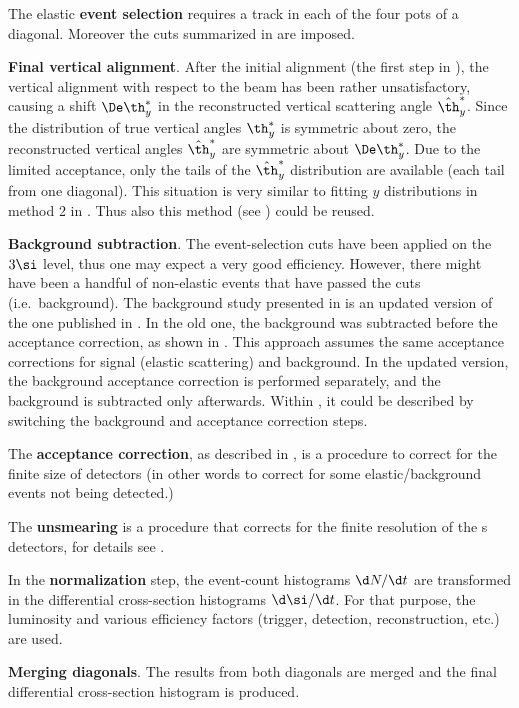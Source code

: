 \> The elastic {\bf event selection} requires a track in each of the four pots of a diagonal. Moreover the cuts summarized in  are imposed.

\> {\bf Final vertical alignment}. After the initial alignment (the first step in ), the vertical alignment with respect to the beam has been rather unsatisfactory, causing a shift $\De\th_y^*$ in the reconstructed vertical scattering angle $\hat \th_y^*$. Since the distribution of true vertical angles $\th_y^*$ is symmetric about zero, the reconstructed vertical angles $\hat\th_y^*$ are symmetric about $\De\th_y^*$. Due to the limited acceptance, only the tails of the $\hat\th_y^*$ distribution are available (each tail from one diagonal). This situation is very similar to fitting $y$ distributions in method 2 in . Thus also this method (see ) could be reused.

\> {\bf Background subtraction}. The event-selection cuts have been applied on the $3\si$ level, thus one may expect a very good efficiency. However, there might have been a handful of non-elastic events that have passed the cuts (i.e.~background). The background study presented in  is an updated version of the one published in . In the old one, the background was subtracted before the acceptance correction, as shown in . This approach assumes the same acceptance corrections for signal (elastic scattering) and background. In the updated version, the background acceptance correction is performed separately, and the background is subtracted only afterwards. Within , it could be described by switching the background and acceptance correction steps.

\> The {\bf acceptance correction}, as described in , is a procedure to correct for the finite size of  detectors (in other words to correct for some elastic/background events not being detected.)

\> The {\bf unsmearing} is a procedure that corrects for the finite resolution of the s detectors, for details see .

\> In the {\bf normalization} step, the event-count histograms $\d N/\d t$ are transformed in the differential cross-section histograms $\d\si/\d t$. For that purpose, the luminosity and various efficiency factors (trigger, detection, reconstruction, etc.) are used.

\> {\bf Merging diagonals}. The results from both diagonals are merged and the final differential cross-section histogram is produced.





